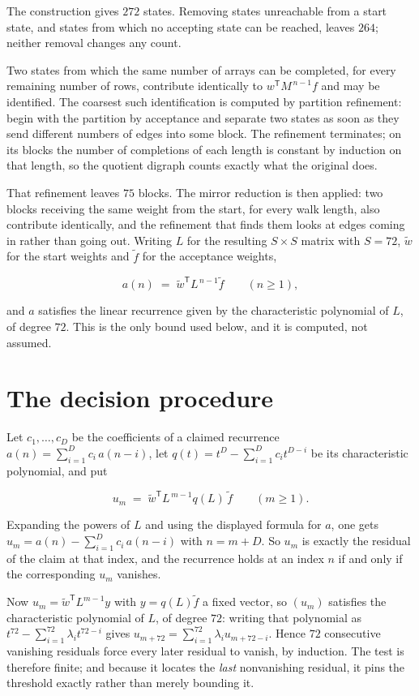 \documentclass[11pt]{article}
\theoremstyle{definition}
\begin{document}
The construction gives $272$ states. Removing states unreachable from a start state, and states from which no accepting state can be reached, leaves $264$; neither removal changes any count.

Two states from which the same number of arrays can be completed, for every remaining number of rows, contribute identically to $w^{\mathsf T}M^{\,n-1}f$ and may be identified. The coarsest such identification is computed by partition refinement: begin with the partition by acceptance and separate two states as soon as they send different numbers of edges into some block. The refinement terminates; on its blocks the number of completions of each length is constant by induction on that length, so the quotient digraph counts exactly what the original does.

That refinement leaves $75$ blocks. The mirror reduction is then applied: two blocks receiving the same weight from the start, for every walk length, also contribute identically, and the refinement that finds them looks at edges coming in rather than going out. Writing $L$ for the resulting $S \times S$ matrix with $S = 72$, $\tilde w$ for the start weights and $\tilde f$ for the acceptance weights,

\[a(n) \;=\; \tilde w^{\mathsf T} L^{\,n-1} \tilde f \qquad (n \ge 1),\]

and $a$ satisfies the linear recurrence given by the characteristic polynomial of $L$, of degree $72$. This is the only bound used below, and it is computed, not assumed.

\section{The decision procedure}

Let $c_1,\dots,c_D$ be the coefficients of a claimed recurrence $a(n) = \sum_{i=1}^{D} c_i\,a(n-i)$, let $q(t) = t^{D} - \sum_{i=1}^{D} c_i t^{D-i}$ be its characteristic polynomial, and put

\[u_m \;=\; \tilde w^{\mathsf T} L^{\,m-1} q(L)\,\tilde f \qquad (m \ge 1).\]

Expanding the powers of $L$ and using the displayed formula for $a$, one gets $u_m = a(n) - \sum_{i=1}^{D} c_i\,a(n-i)$ with $n = m + D$. So $u_m$ is exactly the residual of the claim at that index, and the recurrence holds at an index $n$ if and only if the corresponding $u_m$ vanishes.

Now $u_m = \tilde w^{\mathsf T} L^{m-1} y$ with $y = q(L)\tilde f$ a fixed vector, so $(u_m)$ satisfies the characteristic polynomial of $L$, of degree $72$: writing that polynomial as $t^{72} - \sum_{i=1}^{72} \lambda_i t^{72-i}$ gives $u_{m+72} = \sum_{i=1}^{72} \lambda_i u_{m+72-i}$. Hence $72$ consecutive vanishing residuals force every later residual to vanish, by induction. The test is therefore finite; and because it locates the {\itshape last} nonvanishing residual, it pins the threshold exactly rather than merely bounding it.
\end{document}
